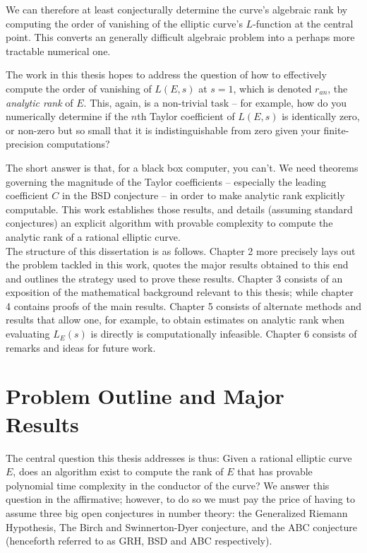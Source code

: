 \documentclass[10pt]{article}
\newcommand{\Les}{L_E(s)}
\begin{document}
We can therefore at least conjecturally determine the curve's algebraic rank by computing the order of vanishing of the elliptic curve's $L$-function at the central point. This converts an generally difficult algebraic problem into a perhaps more tractable numerical one.

The work in this thesis hopes to address the question of how to effectively compute the order of vanishing of $L(E,s)$ at $s=1$, which is denoted $r_{an}$, the {\it analytic rank} of $E$. This, again, is a non-trivial task -- for example, how do you numerically determine if the $n$th Taylor coefficient of $L(E,s)$ is identically zero, or non-zero but so small that it is indistinguishable from zero given your finite-precision computations?

The short answer is that, for a black box computer, you can't. We need theorems governing the magnitude of the Taylor coefficients -- especially the leading coefficient $C$ in the BSD conjecture -- in order to make analytic rank explicitly computable. This work establishes those results, and details (assuming standard conjectures) an explicit algorithm with provable complexity to compute the analytic rank of a rational elliptic curve. \\

The structure of this dissertation is as follows. Chapter 2 more precisely lays out the problem tackled in this work, quotes the major results obtained to this end and outlines the strategy used to prove these results. Chapter 3 consists of an exposition of the mathematical background relevant to this thesis; while chapter 4 contains proofs of the main results. Chapter 5 consists of alternate methods and results that allow one, for example, to obtain estimates on analytic rank when evaluating $\Les$ is directly is computationally infeasible. Chapter 6 consists of remarks and ideas for future work.

\newpage
\section{Problem Outline and Major Results}\label{sec:outline_results}

The central question this thesis addresses is thus: Given a rational elliptic curve $E$, does an algorithm exist to compute the rank of $E$ that has provable polynomial time complexity in the conductor of the curve? We answer this question in the affirmative; however, to do so we must pay the price of having to assume three big open conjectures in number theory: the Generalized Riemann Hypothesis, The Birch and Swinnerton-Dyer conjecture, and the ABC conjecture (henceforth referred to as GRH, BSD and ABC respectively). \\
\end{document}
